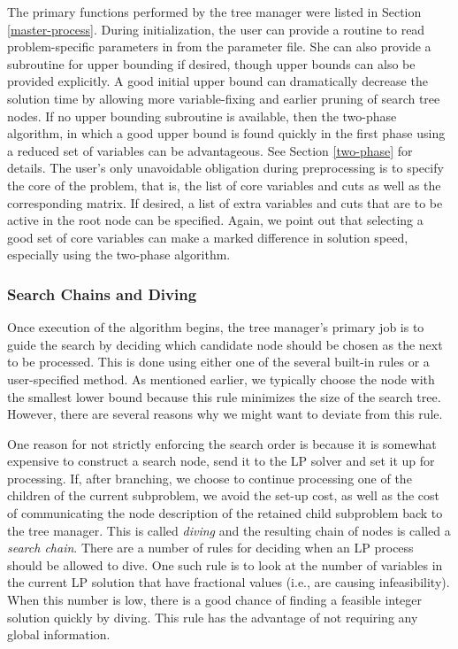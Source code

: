 The primary functions performed by the tree manager were listed in
Section \ref{master-process}. During initialization, the user can
provide a routine to read problem-specific parameters in from the
parameter file. She can also provide a subroutine for upper bounding
if desired, though upper bounds can also be provided explicitly. A
good initial upper bound can dramatically decrease the solution time
by allowing more variable-fixing and earlier pruning of search tree
nodes. If no upper bounding subroutine is available, then the
two-phase algorithm, in which a good upper bound is found quickly in
the first phase using a reduced set of variables can be advantageous.
See Section \ref{two-phase} for details. The user's only unavoidable
obligation during preprocessing is to specify the core of the problem, that
is, the list of core variables and cuts as well as the corresponding matrix.
If desired, a list of extra variables and cuts that are to be active in the
root node can be specified. Again, we point out that selecting a good set
of core variables can make a marked difference in solution speed,
especially using the two-phase algorithm.

\subsubsection{Search Chains and Diving}
\label{tree-management}

Once execution of the algorithm begins, the tree manager's primary job
is to guide the search by deciding which candidate node should be
chosen as the next to be processed. This is done using either one of the
several built-in rules or a user-specified method. 
As mentioned earlier, we typically choose the
node with the smallest lower bound because this rule minimizes
the size of the search tree. However, there are several reasons why we
might want to deviate from this rule. 

One reason for not strictly enforcing the search order is because it
is somewhat expensive to construct a search node, send it to the LP
solver and set it up for processing. If, after branching, we choose to
continue processing one of the children of the current subproblem, we
avoid the set-up cost, as well as the cost of communicating the node
description of the retained child subproblem back to the tree manager.
This is called {\em diving} and the resulting chain of nodes is called
a {\em search chain}. There are a number of rules for deciding when an
LP process should be allowed to dive. One such rule is to look at the
number of variables in the current LP solution that have fractional
values (i.e., are causing infeasibility). When this number is low,
there is a good chance of finding a feasible integer solution quickly
by diving. This rule has the advantage of not requiring any global
information.

